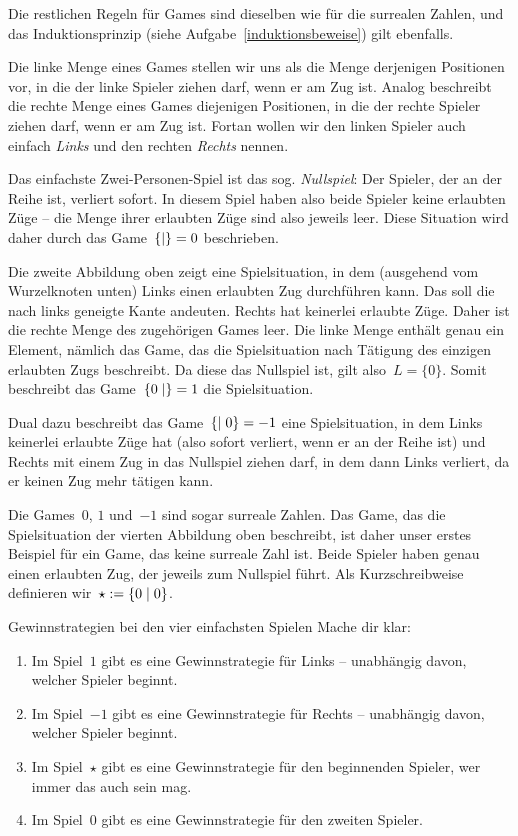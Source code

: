 \documentclass{zirkelblatt}
\begin{document}
Die restlichen Regeln für Games sind dieselben wie für die surrealen Zahlen,
und das Induktionsprinzip (siehe Aufgabe~\ref{induktionsbeweise}) gilt
ebenfalls.

Die linke Menge eines Games stellen wir uns als die Menge derjenigen Positionen
vor, in die der linke Spieler ziehen darf, wenn er am Zug ist. Analog
beschreibt die rechte Menge eines Games diejenigen Positionen, in die der rechte
Spieler ziehen darf, wenn er am Zug ist. Fortan wollen wir den linken Spieler
auch einfach \emph{Links} und den rechten \emph{Rechts} nennen.

Das einfachste Zwei-Personen-Spiel ist das sog. \emph{Nullspiel}: Der Spieler,
der an der Reihe ist, verliert sofort. In diesem Spiel haben also beide Spieler
keine erlaubten Züge -- die Menge ihrer erlaubten Züge sind also jeweils leer.
Diese Situation wird daher durch das Game~$\{  \mathrel{|}  \} = 0$ beschrieben.

Die zweite Abbildung oben zeigt eine Spielsituation, in dem (ausgehend vom Wurzelknoten
unten) Links einen erlaubten Zug durchführen kann. Das soll die
nach links geneigte Kante andeuten. Rechts hat keinerlei erlaubte
Züge. Daher ist die rechte Menge des zugehörigen Games leer. Die linke Menge
enthält genau ein Element, nämlich das Game, das die Spielsituation nach
Tätigung des einzigen erlaubten Zugs beschreibt. Da diese das Nullspiel ist,
gilt also~$L = \{ 0 \}$. Somit beschreibt das Game~$\{ 0 \mathrel{|}  \} = 1$ die
Spielsituation.

Dual dazu beschreibt das Game~$\{  \mathrel{|} 0 \} = -1$ eine Spielsituation, in dem
Links keinerlei erlaubte Züge hat (also sofort verliert, wenn er an der
Reihe ist) und Rechts mit einem Zug in das Nullspiel ziehen darf, in dem
dann Links verliert, da er keinen Zug mehr tätigen kann.

Die Games~$0$, $1$ und~$-1$ sind sogar surreale Zahlen. Das Game, das die
Spielsituation der vierten Abbildung oben beschreibt, ist daher unser erstes
Beispiel für ein Game, das keine surreale Zahl ist. Beide Spieler haben genau
einen erlaubten Zug, der jeweils zum Nullspiel führt. Als Kurzschreibweise
definieren wir~$\star := \{ 0 \mathrel{|} 0 \}$.

\begin{aufgabe}{Gewinnstrategien bei den vier einfachsten Spielen}
\label{analyse4}
Mache dir klar:
\begin{enumerate}
\item Im Spiel~$1$ gibt es eine Gewinnstrategie für Links -- unabhängig davon,
welcher Spieler beginnt.
\item Im Spiel~$-1$ gibt es eine Gewinnstrategie für Rechts -- unabhängig davon,
welcher Spieler beginnt.
\item Im Spiel~$\star$ gibt es eine Gewinnstrategie für den beginnenden Spieler,
wer immer das auch sein mag.
\item Im Spiel~$0$ gibt es eine Gewinnstrategie für den zweiten Spieler.
\end{enumerate}
\end{aufgabe}
\end{document}

